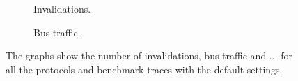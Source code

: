 \begin{figure}[H]
    \centering
    \begin{subfigure}[b]{0.33\textwidth}
        \centering
        \caption{Invalidations.}
        \label{fig:invalidations}
    \end{subfigure}%
    \hfill
    \begin{subfigure}[b]{0.33\textwidth}
        \centering
        \caption{Bus traffic.}
        \label{fig:bus_traffic}
    \end{subfigure}%
    \hfill
    \begin{subfigure}[b]{0.33\textwidth}
        \centering
        \caption{}
        \label{fig:}
    \end{subfigure}
    \hfill
    \caption{The graphs show the number of invalidations, bus traffic and ... for all the protocols and benchmark traces with the default settings.}
    \label{fig:}
\end{figure}

